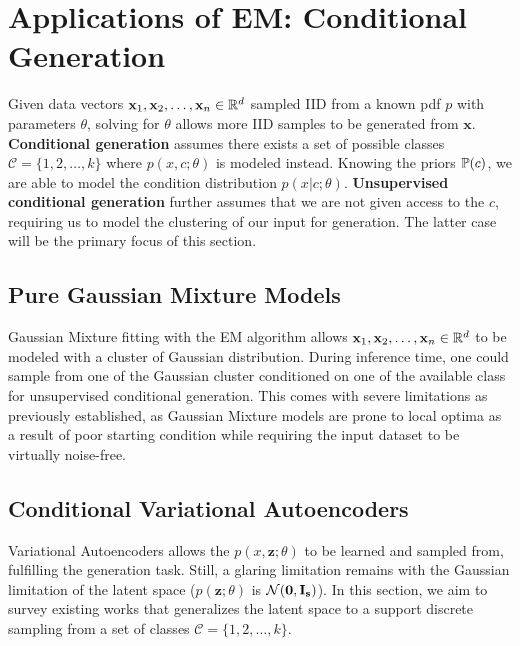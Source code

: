 \section{Applications of EM: Conditional Generation}
\begin{definition}[Generation]
    Given data vectors $\mathbf{x}_1,\mathbf{x}_2,\dots,\mathbf{x}_n\in\mathbb{R}^d$ sampled IID from a known pdf $p$ with parameters $\theta$, solving for $\theta$ allows more IID samples to be generated from $\mathbf{x}$. \textbf{Conditional generation} assumes there exists a set of possible classes $\mathcal{C}=\{1,2,\dots,k\}$ where $p(x,c;\theta)$ is modeled instead. Knowing the priors $\mathbb{P}(c)$, we are able to model the condition distribution $p(x|c;\theta)$. \textbf{Unsupervised conditional generation} further assumes that we are not given access to the $c$, requiring us to model the clustering of our input for generation. The latter case will be the primary focus of this section.
\end{definition}
\subsection{Pure Gaussian Mixture Models}
Gaussian Mixture fitting with the EM algorithm allows $\mathbf{x}_1,\mathbf{x}_2,\dots,\mathbf{x}_n\in\mathbb{R}^d$ to be modeled with a cluster of Gaussian distribution. During inference time, one could sample from one of the Gaussian cluster conditioned on one of the available class for unsupervised conditional generation. This comes with severe limitations as previously established, as Gaussian Mixture models are prone to local optima as a result of poor starting condition while requiring the input dataset to be virtually noise-free. 

\subsection{Conditional Variational Autoencoders}
Variational Autoencoders allows the $p(x,\mathbf{z};\theta)$ to be learned and sampled from, fulfilling the generation task. Still, a glaring limitation remains with the Gaussian limitation of the latent space ($p(\mathbf{z};\theta)$ is $\mathcal{N}(\mathbf{0},\mathbf{I_s})$). In this section, we aim to survey existing works that generalizes the latent space to a support discrete sampling from a set of classes $\mathcal{C}=\{1,2,\dots,k\}$.

